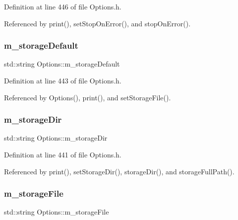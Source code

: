 Definition at line 446 of file Options.\+h.



Referenced by print(), set\+Stop\+On\+Error(), and stop\+On\+Error().

\mbox{\label{classOptions_ab077e872fd03f7bf64f3a354d0c4a2f5}} 
\subsubsection{\texorpdfstring{m\+\_\+storage\+Default}{m\_storageDefault}}
{\footnotesize\ttfamily std\+::string Options\+::m\+\_\+storage\+Default\hspace{0.3cm}{\ttfamily [private]}}



Definition at line 443 of file Options.\+h.



Referenced by Options(), print(), and set\+Storage\+File().

\mbox{\label{classOptions_a88d9ed92fceb1c91e4df59bc1f81ab3b}} 
\subsubsection{\texorpdfstring{m\+\_\+storage\+Dir}{m\_storageDir}}
{\footnotesize\ttfamily std\+::string Options\+::m\+\_\+storage\+Dir\hspace{0.3cm}{\ttfamily [private]}}



Definition at line 441 of file Options.\+h.



Referenced by print(), set\+Storage\+Dir(), storage\+Dir(), and storage\+Full\+Path().

\mbox{\label{classOptions_a4d952db4e93d3aae6db86d89faa3677a}} 
\subsubsection{\texorpdfstring{m\+\_\+storage\+File}{m\_storageFile}}
{\footnotesize\ttfamily std\+::string Options\+::m\+\_\+storage\+File\hspace{0.3cm}{\ttfamily [private]}}



